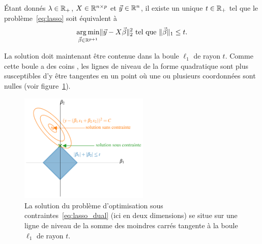 Étant donnés $\lambda \in \mathbb{R}_+$, $X \in \mathbb{R}^{n \times p}$ et $\yy \in \RR^n$,
il existe un unique $t \in \mathbb{R}_+$ tel que le problème~\ref{eq:lasso} soit
équivalent à
\begin{equation}
  \label{eq:lasso_dual}
  \argmin_{\bbeta \in \RR^{p+1}} \ltwonorm{\yy - X \bbeta}^2 \text{ tel que }
  \lonenorm{\bbeta} \leq t.
\end{equation}

La solution doit maintenant être contenue dans la boule $\ell_1$ de rayon
$t$. Comme cette boule a des \og coins \fg, les lignes de niveau de la forme
quadratique sont plus susceptibles d'y être tangentes en un point où une ou
plusieurs coordonnées sont nulles (voir figure~\ref{fig:l1reg}).

\begin{figure}[h]
  \centering \includegraphics[width=0.55\textwidth]{figures/generalisation/l1reg}
  \caption{La solution du problème d'optimisation sous
    contraintes~\ref{eq:lasso_dual} (ici en deux dimensions) se situe sur
    une ligne de niveau de la somme des moindres carrés tangente à la boule
    $\ell_1$ de rayon $t$.}
  \label{fig:l1reg}
\end{figure}



